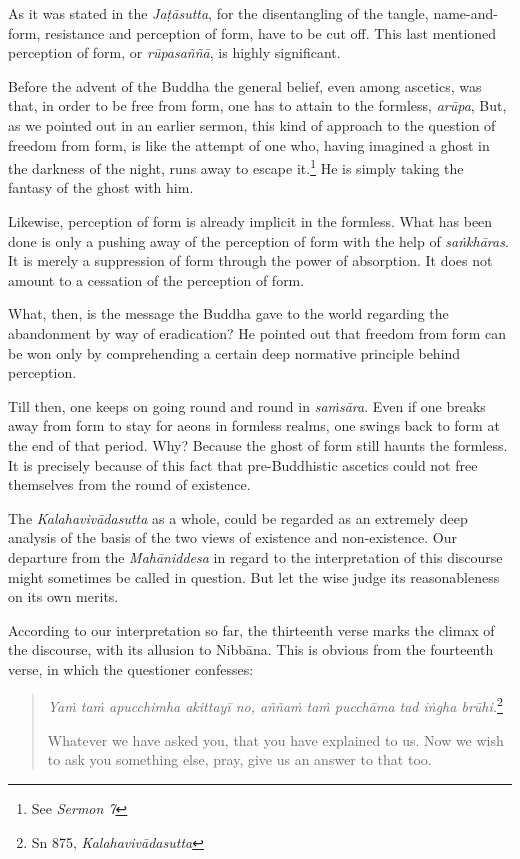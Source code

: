As it was stated in the \emph{Jaṭāsutta}, for the disentangling of the tangle, name-and-form, resistance and perception of form, have to be cut off. This last mentioned perception of form, or \emph{rūpasaññā}, is highly significant.

Before the advent of the Buddha the general belief, even among ascetics, was that, in order to be free from form, one has to attain to the formless, \emph{arūpa}, But, as we pointed out in an earlier sermon, this kind of approach to the question of freedom from form, is like the attempt of one who, having imagined a ghost in the darkness of the night, runs away to escape it.\footnote{See \emph{Sermon 7}} He is simply taking the fantasy of the ghost with him.

Likewise, perception of form is already implicit in the formless. What has been done is only a pushing away of the perception of form with the help of \emph{saṅkhāras}. It is merely a suppression of form through the power of absorption. It does not amount to a cessation of the perception of form.

What, then, is the message the Buddha gave to the world regarding the abandonment by way of eradication? He pointed out that freedom from form can be won only by comprehending a certain deep normative principle behind perception.

Till then, one keeps on going round and round in \emph{saṁsāra}. Even if one breaks away from form to stay for aeons in formless realms, one swings back to form at the end of that period. Why? Because the ghost of form still haunts the formless. It is precisely because of this fact that pre-Buddhistic ascetics could not free themselves from the round of existence.

The \emph{Kalahavivādasutta} as a whole, could be regarded as an extremely deep analysis of the basis of the two views of existence and non-existence. Our departure from the \emph{Mahāniddesa} in regard to the interpretation of this discourse might sometimes be called in question. But let the wise judge its reasonableness on its own merits.

According to our interpretation so far, the thirteenth verse marks the climax of the discourse, with its allusion to Nibbāna. This is obvious from the fourteenth verse, in which the questioner confesses:

\begin{quote}
\emph{Yaṁ taṁ apucchimha akittayī no, aññaṁ taṁ pucchāma tad iṅgha brūhi.}\footnote{Sn 875, \emph{Kalahavivādasutta}}

Whatever we have asked you, that you have explained to us. Now we wish to ask you something else, pray, give us an answer to that too.
\end{quote}


